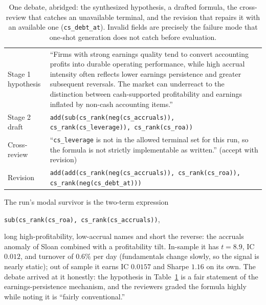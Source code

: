 \documentclass{article}
\theoremstyle{definition}
\theoremstyle{plain}
\theoremstyle{remark}
\begin{document}
\begin{table}[h]
\centering
\small
\begin{tabular}{@{}p{2.4cm}p{10.4cm}@{}}
\toprule
Stage 1 hypothesis & ``Firms with strong earnings quality tend to convert accounting
profits into durable operating performance, while high accrual intensity often reflects
lower earnings persistence and greater subsequent reversals. The market can underreact
to the distinction between cash-supported profitability and earnings inflated by
non-cash accounting items.'' \\
\addlinespace
Stage 2 draft & \texttt{add(sub(cs\_rank(neg(cs\_accruals)), cs\_rank(cs\_leverage)),
cs\_rank(cs\_roa))} \\
\addlinespace
Cross-review & ``\texttt{cs\_leverage} is not in the allowed terminal set for this run,
so the formula is not strictly implementable as written.'' (accept with revision) \\
\addlinespace
Revision & \texttt{add(add(cs\_rank(neg(cs\_accruals)), cs\_rank(cs\_roa)),
cs\_rank(neg(cs\_debt\_at)))} \\
\bottomrule
\end{tabular}
\caption{One debate, abridged: the synthesized hypothesis, a drafted formula, the
cross-review that catches an unavailable terminal, and the revision that repairs it with
an available one (\texttt{cs\_debt\_at}). Invalid fields are precisely the failure mode
that one-shot generation does not catch before evaluation.}
\label{tab:trace}
\end{table}

The run's modal survivor is the two-term expression
\begin{center}
\texttt{sub(cs\_rank(cs\_roa), cs\_rank(cs\_accruals))},
\end{center}
long high-profitability, low-accrual names and short the reverse: the accruals anomaly
of Sloan \cite{sloan1996} combined with a profitability tilt. In-sample it has $t=8.9$,
IC $0.012$, and turnover of $0.6\%$ per day (fundamentals change slowly, so the signal
is nearly static); out of sample it earns IC $0.0157$ and Sharpe $1.16$ on its own. The
debate arrived at it honestly: the hypothesis in Table~\ref{tab:trace} is a fair
statement of the earnings-persistence mechanism, and the reviewers graded the formula
highly while noting it is ``fairly conventional.''
\end{document}
